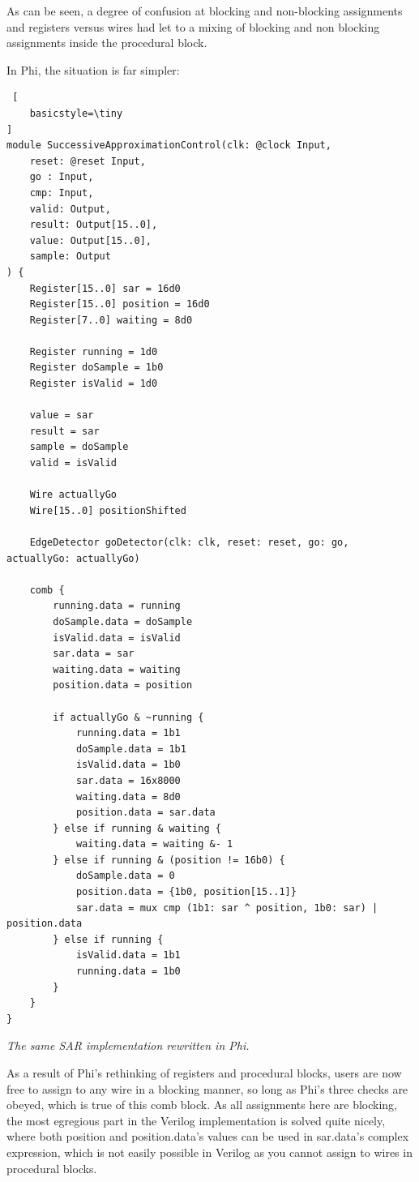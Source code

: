 \documentclass[10pt, two column]{article}
\theoremstyle{definition}
\begin{document}
As can be seen, a degree of confusion at blocking and non-blocking assignments and registers versus wires had let to a mixing of blocking and non blocking assignments inside the procedural block.

In Phi, the situation is far simpler:

\begin{lstlisting} [
    basicstyle=\tiny
]
module SuccessiveApproximationControl(clk: @clock Input,
    reset: @reset Input,
    go : Input,
    cmp: Input,
    valid: Output,
    result: Output[15..0],
    value: Output[15..0],
    sample: Output
) {
    Register[15..0] sar = 16d0
    Register[15..0] position = 16d0
    Register[7..0] waiting = 8d0

    Register running = 1d0
    Register doSample = 1b0
    Register isValid = 1d0

    value = sar
    result = sar
    sample = doSample
    valid = isValid

    Wire actuallyGo
    Wire[15..0] positionShifted

    EdgeDetector goDetector(clk: clk, reset: reset, go: go, actuallyGo: actuallyGo)

    comb {
        running.data = running
        doSample.data = doSample
        isValid.data = isValid
        sar.data = sar
        waiting.data = waiting
        position.data = position

        if actuallyGo & ~running {
            running.data = 1b1
            doSample.data = 1b1
            isValid.data = 1b0
            sar.data = 16x8000
            waiting.data = 8d0
            position.data = sar.data
        } else if running & waiting {
            waiting.data = waiting &- 1
        } else if running & (position != 16b0) {
            doSample.data = 0
            position.data = {1b0, position[15..1]}
            sar.data = mux cmp (1b1: sar ^ position, 1b0: sar) | position.data
        } else if running {
            isValid.data = 1b1
            running.data = 1b0
        }
    }
}
\end{lstlisting}
\begin{center}
\textit{The same SAR implementation rewritten in Phi.}
\end{center}

As a result of Phi's rethinking of registers and procedural blocks, users are now free to assign to any wire in a blocking manner, so long as Phi's three checks are obeyed, which is true of this comb block. As all assignments here are blocking, the most egregious part in the Verilog implementation is solved quite nicely, where both position and position.data's values can be used in sar.data's complex expression, which is not easily possible in Verilog as you cannot assign to wires in procedural blocks.
\end{document}
